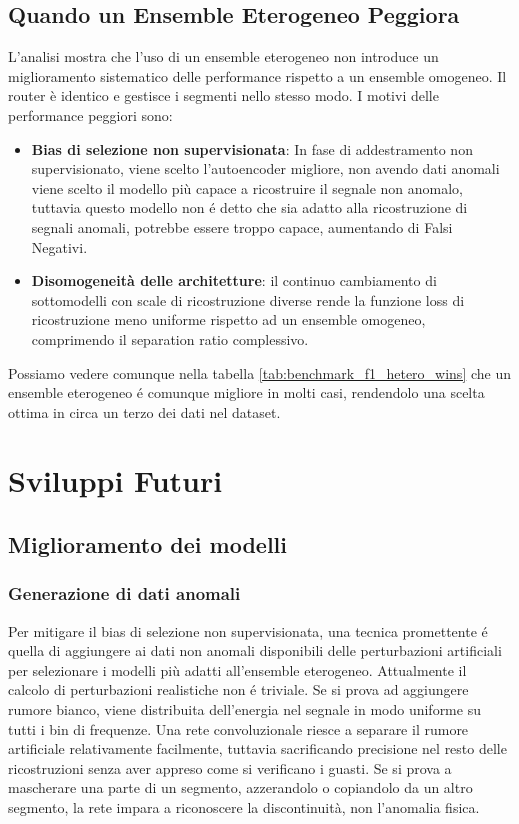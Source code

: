 \subsection{Quando un Ensemble Eterogeneo Peggiora}
L'analisi mostra che l'uso di un ensemble eterogeneo non introduce un miglioramento sistematico delle performance rispetto a un ensemble omogeneo. Il router è identico e gestisce i segmenti nello stesso modo. 
I motivi delle performance peggiori sono:
\begin{itemize}
	\item \textbf{Bias di selezione non supervisionata}: In fase di addestramento non supervisionato, viene scelto l'autoencoder migliore, non avendo dati anomali viene scelto il modello più capace a ricostruire il segnale non anomalo, tuttavia questo modello non é detto che sia adatto alla ricostruzione di segnali anomali, potrebbe essere troppo capace, aumentando di Falsi Negativi. 
	
	\item \textbf{Disomogeneità delle architetture}: il continuo cambiamento di sottomodelli con scale di ricostruzione diverse rende la funzione loss di ricostruzione meno uniforme rispetto ad un ensemble omogeneo, comprimendo il separation ratio complessivo.
	
\end{itemize}

Possiamo vedere comunque nella tabella \ref{tab:benchmark_f1_hetero_wins} che un ensemble eterogeneo é comunque migliore in molti casi, rendendolo una scelta ottima in circa un terzo dei dati nel dataset.

\newpage
\section{Sviluppi Futuri}
\subsection{Miglioramento dei modelli}
\subsubsection{Generazione di dati anomali}
Per mitigare il bias di selezione non supervisionata, una tecnica promettente é quella di aggiungere ai dati non anomali disponibili delle perturbazioni artificiali per selezionare i modelli più adatti all'ensemble eterogeneo. 
Attualmente il calcolo di perturbazioni realistiche non é triviale.
Se si prova ad aggiungere rumore bianco, viene distribuita dell'energia nel segnale in modo uniforme  su tutti i bin di frequenze. Una rete convoluzionale riesce a separare il rumore artificiale relativamente facilmente, tuttavia sacrificando precisione nel resto delle ricostruzioni senza aver appreso come si verificano i guasti. 
Se si prova a mascherare una parte di un segmento, azzerandolo o copiandolo da un altro segmento, la rete impara a riconoscere la discontinuità, non l'anomalia fisica.

